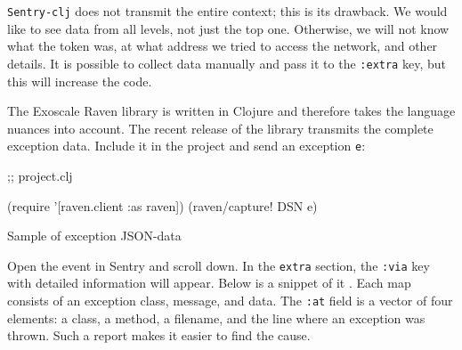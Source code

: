 \verb|Sentry-clj| does not transmit the entire context; this is its drawback. We would like to see data from all levels, not just the top one. Otherwise, we will not know what the token was, at what address we tried to access the network, and other details. It is possible to collect data manually and pass it to the \verb|:extra| key, but this will increase the code.


The Exoscale Raven library is written in Clojure and therefore takes the language nuances into account. The recent release of the library transmits the complete exception data. Include it in the project and send an exception \verb|e|:

\begin{clojure}
 ;; project.clj

(require '[raven.client :as raven])
(raven/capture! DSN e)
\end{clojure}

\begin{listing}[ht!]

\ifx\DEVICETYPE\MOBILE

\begin{json}
\end{json}

\else

\begin{json}
\end{json}

\fi

  \caption{Sample of exception JSON-data}
  \label{fig:ex-json-data}
\end{listing}

Open the event in Sentry and scroll down. In the \verb|extra| section, the \verb|:via| key with detailed information will appear. Below is a snippet of it . Each map consists of an exception class, message, and data. The \verb|:at| field is a vector of four elements: a class, a method, a filename, and the line where an exception was thrown. Such a report makes it easier to find the cause.

